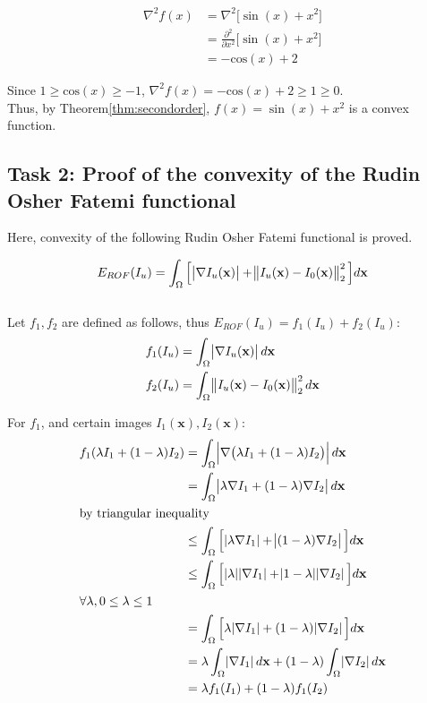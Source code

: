 \documentclass[paper=a4, fontsize=11pt]{scrartcl} %
\numberwithin{equation}{section} %
\numberwithin{figure}{section} %
\numberwithin{table}{section} %
\renewcommand{\vec}[1]{\mathbf{#1}}
\begin{document}
\begin{itemize}
\begin{align}
	\nabla^2 f(x) &= \nabla^2 \big[ \sin(x) + x^2 \big] \\
	&= \frac{\partial^2}{\partial x^2} \big[ \sin(x) + x^2 \big] \\
	&= - \text{cos}(x) + 2
\end{align}

Since $1 \geq \text{cos}(x) \geq -1$, $\nabla^2 f(x) = - \text{cos}(x) + 2 \geq 1 \geq 0$. \\ 

Thus, by Theorem\ref{thm:secondorder}, $f(x) = \sin(x) + x^2$ is a convex function.
	
\end{itemize}


\subsection{Task 2: Proof of the convexity of the Rudin Osher Fatemi functional}

Here, convexity of the following Rudin Osher Fatemi functional is proved. 

\begin{equation}
	E_{ROF}(I_u) = \int_\Omega \Big[\abs{\nabla I_u(\vec{x})} + \norm{I_u(\vec{x}) - I_0(\vec{x})}_2^2 \Big] d\vec{x}
\end{equation} \\

Let $f_1, f_2$ are defined as follows, thus $E_{ROF}(I_u) = f_1(I_u) + f_2(I_u)$:
\begin{align}
	f_1(I_u) &= \int_\Omega \abs{\nabla I_u(\vec{x})} d\vec{x} \\
	f_2(I_u) &= \int_\Omega \norm{I_u(\vec{x}) - I_0(\vec{x})}_2^2 d\vec{x}
\end{align}

For $f_1$, and certain images $I_1(\vec{x}), I_2(\vec{x})$:
\begin{align}
	f_1(\lambda I_1 + (1 - \lambda) I_2) 
	&= \int_\Omega \abs{\nabla \big( \lambda I_1 + (1 - \lambda) I_2 \big) } d\vec{x} \\
	&= \int_\Omega \abs{\lambda \nabla I_1 + (1 - \lambda) \nabla I_2} d\vec{x} \\
	\shortintertext{by triangular inequality}
	&\leq \int_\Omega \Big[ \abs{\lambda \nabla I_1} + \abs{(1 - \lambda) \nabla I_2} \Big] d\vec{x} \\ 
	&\leq \int_\Omega \Big[ \abs{\lambda} \abs{\nabla I_1} + \abs{1 - \lambda}\abs{\nabla I_2} \Big] d\vec{x} \\
	\shortintertext{$\forall \lambda, 0 \leq \lambda \leq 1$}
	&= \int_\Omega \Big[ \lambda \abs{\nabla I_1} + (1 - \lambda) \abs{\nabla I_2} \Big] d\vec{x} \\
	&= \lambda \int_\Omega \abs{\nabla I_1} d\vec{x} + (1 - \lambda) \int_\Omega \abs{\nabla I_2} d\vec{x} \\
	&= \lambda f_1(I_1) + (1 - \lambda) f_1(I_2) 
\end{align}
\end{document}
